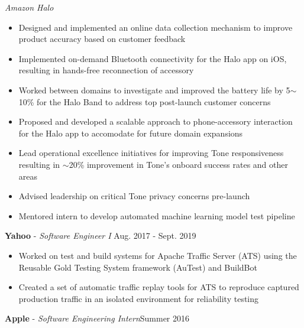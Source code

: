 \documentclass[resmargin]{res}
\begin{document}
\begin{resume}
	{\sl Amazon Halo}
	\begin{itemize}
		\vspace{1mm}
		\item Designed and implemented an online data collection mechanism to improve product accuracy based on customer feedback
		\item Implemented on-demand Bluetooth connectivity for the Halo app on iOS, resulting in hands-free reconnection of accessory
		\item Worked between domains to investigate and improved the battery life by 5$\sim$10\% for the Halo Band to address top post-launch customer concerns
		\item Proposed and developed a scalable approach to phone-accessory interaction for the Halo app to accomodate for future domain expansions
		\item Lead operational excellence initiatives for improving Tone responsiveness resulting in $\sim$20\% improvement in Tone's onboard success rates and other areas
		\item Advised leadership on critical Tone privacy concerns pre-launch
		\item Mentored intern to develop automated machine learning model test pipeline
	\end{itemize}

	{\bf Yahoo} - {\sl Software Engineer I} \hfill Aug. 2017 - Sept. 2019	
	\begin{itemize}
		\vspace{1mm}
		\item Worked on test and build systems for Apache Traffic Server (ATS) using the Reusable Gold Testing System framework (AuTest) and BuildBot
		\item Created a set of automatic traffic replay tools for ATS to reproduce captured production traffic in an isolated environment for reliability testing
	\end{itemize}
	
	{\bf Apple} - {\sl Software Engineering Intern}\hfill Summer 2016
	

\end{resume}
\end{document}
